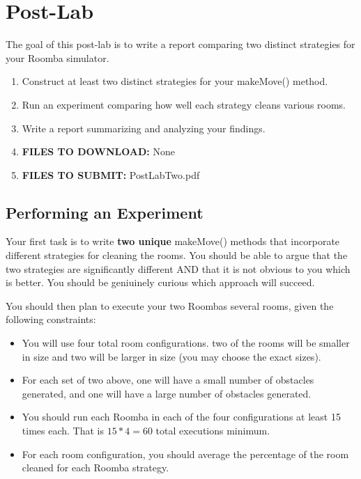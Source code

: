\documentclass[paper=a4, fontsize=11pt, parskip=full]{scrartcl} %
\numberwithin{equation}{section} %
\numberwithin{figure}{section} %
\numberwithin{table}{section} %
\begin{document}


\newpage
\section{Post-Lab}

The goal of this post-lab is to write a report comparing two distinct strategies for your Roomba simulator. 

\begin{enumerate}
	\item Construct at least two distinct strategies for your makeMove() method. 
	\item Run an experiment comparing how well each strategy cleans various rooms.
	\item Write a report summarizing and analyzing your findings.
	\item \textbf{FILES TO DOWNLOAD:} None
	\item \textbf{FILES TO SUBMIT:} PostLabTwo.pdf
\end{enumerate}

\subsection{Performing an Experiment}

Your first task is to write \textbf{two unique} makeMove() methods that incorporate different strategies for cleaning the rooms. You should be able to argue that the two strategies are significantly different AND that it is not obvious to you which is better. You should be geniuinely curious which approach will succeed.

You should then plan to execute your two Roombas several rooms, given the following constraints:

\begin{itemize}
	\item You will use four total room configurations. two of the rooms will be smaller in size and two will be larger in size (you may choose the exact sizes).
	\item For each set of two above, one will have a small number of obstacles generated, and one will have a large number of obstacles generated.
	\item You should run each Roomba in each of the four configurations at least 15 times each. That is $15 * 4 = 60$ total executions minimum.
	\item For each room configuration, you should average the percentage of the room cleaned for each Roomba strategy.
\end{itemize}
\end{document}
